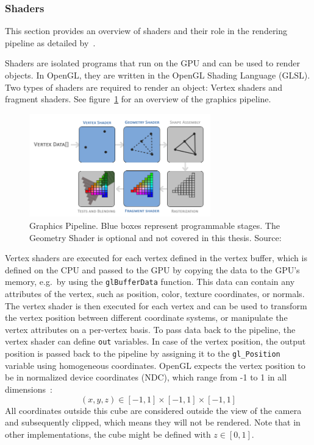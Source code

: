 \subsubsection{Shaders}\label{subsec:shaders}

This section provides an overview of shaders and their role in the rendering pipeline as detailed by~\cite{de_vries_learn_2020}.

Shaders are isolated programs that run on the GPU and can be used to render objects.
In OpenGL, they are written in the OpenGL Shading Language (GLSL).
Two types of shaders are required to render an object: Vertex shaders and fragment shaders.
See figure~\ref{fig:graphics-pipeline} for an overview of the graphics pipeline.
\begin{figure}[h!]
    \centering
    \includegraphics[width=0.70\textwidth]{images/graphics-pipeline}
    \caption{Graphics Pipeline. Blue boxes represent programmable stages. The Geometry Shader is optional and not covered in this thesis. Source:~\cite{de_vries_learn_2020}}
    \label{fig:graphics-pipeline}
\end{figure}

Vertex shaders are executed for each vertex defined in the vertex buffer, which is defined on the CPU and
passed to the GPU by copying the data to the GPU's memory, e.g.\ by using the \texttt{glBufferData} function.
This data can contain any attributes of the vertex, such as position, color, texture coordinates, or normals.
The vertex shader is then executed for each vertex and can be used to transform the vertex position between different coordinate systems,
or manipulate the vertex attributes on a per-vertex basis.
To pass data back to the pipeline, the vertex shader can define \texttt{out} variables.
In case of the vertex position, the output position is passed back to the
pipeline by assigning it to the \texttt{gl\_Position} variable using homogeneous coordinates.
OpenGL expects the vertex position to be in normalized device coordinates (NDC),
which range from -1 to 1 in all dimensions~\cite{dorner_virtual_2019}:
\begin{equation}
    (x, y, z) \in [-1, 1] \times [-1, 1] \times [-1, 1]
\end{equation}
All coordinates outside this cube are considered outside the view of the camera and subsequently clipped,
which means they will not be rendered.
Note that in other implementations, the cube might be defined with $z \in [0, 1]$.

